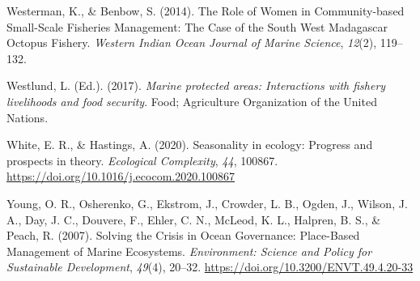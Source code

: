 \documentclass[
]{article}
\newlength{\cslhangindent}
\newlength{\cslentryspacingunit} %
\newenvironment{CSLReferences}[2] %
 {%
  \setlength{\parindent}{0pt}
  \ifodd #1
  \let\oldpar\par
  \def\par{\hangindent=\cslhangindent\oldpar}
  \fi
  \setlength{\parskip}{#2\cslentryspacingunit}
 }%
 {}
\begin{document}
\begin{CSLReferences}{1}{0}
\leavevmode{}%
Westerman, K., \& Benbow, S. (2014). The {Role} of {Women} in {Community}-based {Small}-{Scale} {Fisheries} {Management}: {The} {Case} of the {South} {West} {Madagascar} {Octopus} {Fishery}. \emph{Western Indian Ocean Journal of Marine Science}, \emph{12}(2), 119--132.

\leavevmode{}%
Westlund, L. (Ed.). (2017). \emph{Marine protected areas: Interactions with fishery livelihoods and food security}. Food; Agriculture Organization of the United Nations.

\leavevmode{}%
White, E. R., \& Hastings, A. (2020). Seasonality in ecology: {Progress} and prospects in theory. \emph{Ecological Complexity}, \emph{44}, 100867. \url{https://doi.org/10.1016/j.ecocom.2020.100867}

\leavevmode{}%
Young, O. R., Osherenko, G., Ekstrom, J., Crowder, L. B., Ogden, J., Wilson, J. A., Day, J. C., Douvere, F., Ehler, C. N., McLeod, K. L., Halpren, B. S., \& Peach, R. (2007). Solving the {Crisis} in {Ocean} {Governance}: {Place}-{Based} {Management} of {Marine} {Ecosystems}. \emph{Environment: Science and Policy for Sustainable Development}, \emph{49}(4), 20--32. \url{https://doi.org/10.3200/ENVT.49.4.20-33}

\end{CSLReferences}
\end{document}
